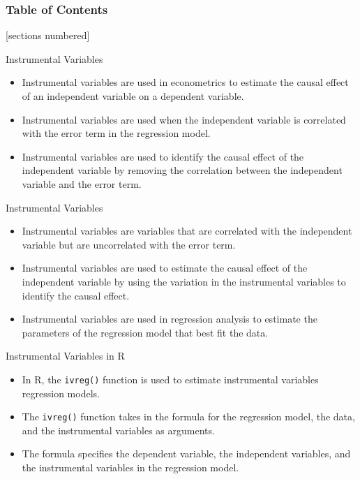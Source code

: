 \documentclass[serif, 9pt, aspectratio=32]{beamer}
\begin{document}
\begin{frame}
    \frametitle{Table of Contents}
    [sections numbered]
    \tableofcontents[currentsection]
\end{frame}

\begin{frame}{Instrumental Variables}
    \begin{itemize}
        \setlength{\itemsep}{2em}
        \item Instrumental variables are used in econometrics to estimate the causal effect of an independent variable on a dependent variable.
        \item Instrumental variables are used when the independent variable is correlated with the error term in the regression model.
        \item Instrumental variables are used to identify the causal effect of the independent variable by removing the correlation between the independent variable and the error term.
    \end{itemize}
\end{frame}

\begin{frame}{Instrumental Variables}
    \begin{itemize}
        \setlength{\itemsep}{2em}
        \item Instrumental variables are variables that are correlated with the independent variable but are uncorrelated with the error term.
        \item Instrumental variables are used to estimate the causal effect of the independent variable by using the variation in the instrumental variables to identify the causal effect.
        \item Instrumental variables are used in regression analysis to estimate the parameters of the regression model that best fit the data.
    \end{itemize}
\end{frame}

\begin{frame}{Instrumental Variables in R}
    \begin{itemize}
        \setlength{\itemsep}{2em}
        \item In R, the \texttt{ivreg()} function is used to estimate instrumental variables regression models.
        \item The \texttt{ivreg()} function takes in the formula for the regression model, the data, and the instrumental variables as arguments.
        \item The formula specifies the dependent variable, the independent variables, and the instrumental variables in the regression model.
    \end{itemize}
\end{frame}
\end{document}
